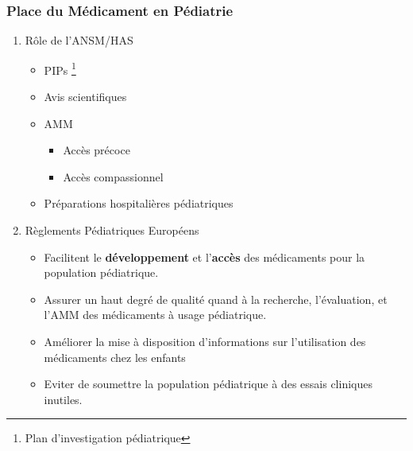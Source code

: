 \documentclass[11pt]{article}
\begin{document}
\subsubsection{Place du Médicament en Pédiatrie}
\label{sec:orgc425db4}
\begin{enumerate}
\item Rôle de l'ANSM/HAS
\label{sec:org0ea9f42}
\begin{itemize}
\item PIPs \footnote{Plan d'investigation pédiatrique}
\item Avis scientifiques
\item AMM
\begin{itemize}
\item Accès précoce
\item Accès compassionnel
\end{itemize}
\item Préparations hospitalières pédiatriques
\end{itemize}
\item Règlements Pédiatriques Européens
\label{sec:org81e12d6}
\begin{itemize}
\item Facilitent le \textbf{développement} et l'\textbf{accès} des médicaments pour la population pédiatrique.
\item Assurer un haut degré de qualité quand à la recherche, l'évaluation, et l'AMM des médicaments à usage pédiatrique.
\item Améliorer la mise à disposition d'informations sur l'utilisation des médicaments chez les enfants
\item Eviter de soumettre la population pédiatrique à des essais cliniques inutiles.
\end{itemize}
\end{enumerate}
\end{document}
